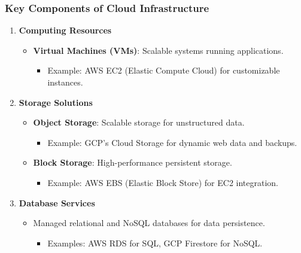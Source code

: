 \documentclass[aspectratio=169]{beamer}
\begin{document}
\begin{frame}[fragile]
    \frametitle{Key Components of Cloud Infrastructure}
    \begin{enumerate}
        \item \textbf{Computing Resources}
        \begin{itemize}
            \item \textbf{Virtual Machines (VMs)}: Scalable systems running applications.
            \begin{itemize}
                \item Example: AWS EC2 (Elastic Compute Cloud) for customizable instances.
            \end{itemize}
        \end{itemize}
        
        \item \textbf{Storage Solutions}
        \begin{itemize}
            \item \textbf{Object Storage}: Scalable storage for unstructured data.
            \begin{itemize}
                \item Example: GCP's Cloud Storage for dynamic web data and backups.
            \end{itemize}
            \item \textbf{Block Storage}: High-performance persistent storage.
            \begin{itemize}
                \item Example: AWS EBS (Elastic Block Store) for EC2 integration.
            \end{itemize}
        \end{itemize}
        
        \item \textbf{Database Services}
        \begin{itemize}
            \item Managed relational and NoSQL databases for data persistence.
            \begin{itemize}
                \item Examples: AWS RDS for SQL, GCP Firestore for NoSQL.
            \end{itemize}
        \end{itemize}
    \end{enumerate}
\end{frame}
\end{document}
